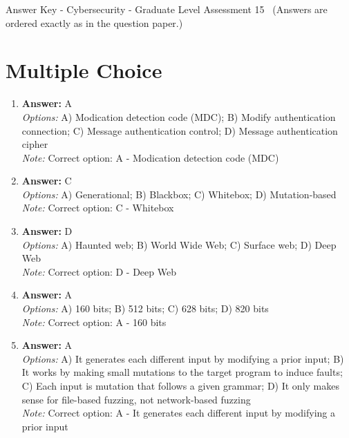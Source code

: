\documentclass[12pt]{article}
\begin{document}
\begin{center}
Answer Key - Cybersecurity - Graduate Level Assessment 15 \
\small (Answers are ordered exactly as in the question paper.)
\end{center}

\section*{Multiple Choice}
\begin{enumerate}[label=\arabic*.]
\item \textbf{Answer:} A
\\ \textit{Options:} A) Modication detection code (MDC); B) Modify authentication connection; C) Message authentication control; D) Message authentication cipher
\\ \textit{Note:} Correct option: A - Modication detection code (MDC)
\item \textbf{Answer:} C
\\ \textit{Options:} A) Generational; B) Blackbox; C) Whitebox; D) Mutation-based
\\ \textit{Note:} Correct option: C - Whitebox
\item \textbf{Answer:} D
\\ \textit{Options:} A) Haunted web; B) World Wide Web; C) Surface web; D) Deep Web
\\ \textit{Note:} Correct option: D - Deep Web
\item \textbf{Answer:} A
\\ \textit{Options:} A) 160 bits; B) 512 bits; C) 628 bits; D) 820 bits
\\ \textit{Note:} Correct option: A - 160 bits
\item \textbf{Answer:} A
\\ \textit{Options:} A) It generates each different input by modifying a prior input; B) It works by making small mutations to the target program to induce faults; C) Each input is mutation that follows a given grammar; D) It only makes sense for file-based fuzzing, not network-based fuzzing
\\ \textit{Note:} Correct option: A - It generates each different input by modifying a prior input
\end{enumerate}
\end{document}
